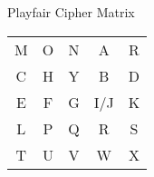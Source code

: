 \begin{withoutheadline}
\begin{frame}[fragile]{Playfair Cipher Matrix}
\begin{tabular}{|c|c|c|c|c|}
  M & O & N & A & R   \\
  C & H & Y & B & D   \\
  E & F & G & I/J & K \\
  L & P & Q & R & S   \\
  T & U & V & W & X   \\
\end{tabular}
\end{frame}

\end{withoutheadline}
 
